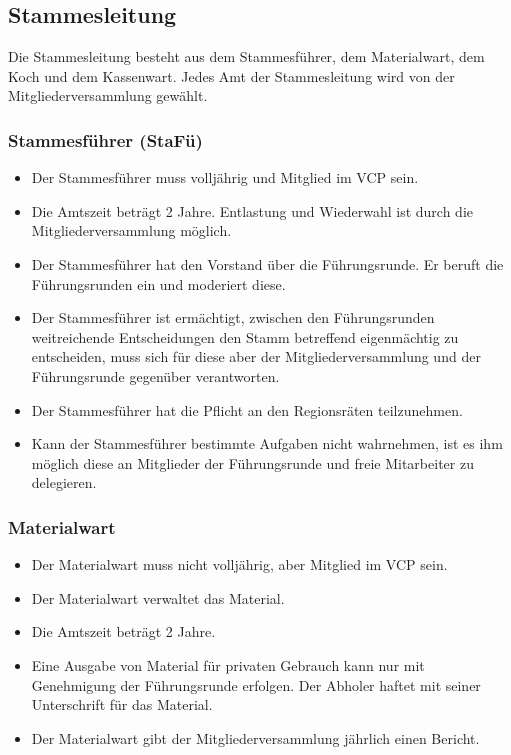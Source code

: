 \documentclass[a4paper]{article}
\begin{document}
    \subsection{Stammesleitung} %
    \label{sub:stammesleitung}
    Die Stammesleitung besteht aus dem Stammesführer, dem Materialwart, dem Koch und dem Kassenwart. Jedes Amt der Stammesleitung wird von der Mitgliederversammlung gewählt.
    \subsubsection{Stammesführer (StaFü)} %
    \label{ssub:stammesfuhrer_stafu}
	\begin{itemize}
        \item Der Stammesführer muss volljährig und Mitglied im VCP sein.
        \item Die Amtszeit beträgt 2 Jahre. Entlastung und Wiederwahl ist durch die Mitgliederversammlung möglich.
        \item Der Stammesführer hat den Vorstand über die Führungsrunde. Er beruft die Führungsrunden ein und moderiert diese.
        \item Der Stammesführer ist ermächtigt, zwischen den Führungsrunden weitreichende Entscheidungen den Stamm betreffend eigenmächtig zu entscheiden, muss sich für diese aber der Mitgliederversammlung und der Führungsrunde gegenüber verantworten.
        \item Der Stammesführer hat die Pflicht an den Regionsräten teilzunehmen.
        \item Kann der Stammesführer bestimmte Aufgaben nicht wahrnehmen, ist es ihm möglich diese an Mitglieder der Führungsrunde und freie Mitarbeiter zu delegieren.
	\end{itemize}
    
    \subsubsection{Materialwart} %
    \label{ssub:materialwart}
	\begin{itemize}
		\item Der Materialwart muss nicht volljährig, aber Mitglied im VCP sein. 
		\item Der Materialwart verwaltet das Material. 
		\item Die Amtszeit beträgt 2 Jahre. 
		\item Eine Ausgabe von Material für privaten Gebrauch kann nur mit Genehmigung der Führungsrunde erfolgen. Der Abholer haftet mit seiner Unterschrift für das Material. 
		\item Der Materialwart gibt der Mitgliederversammlung jährlich einen Bericht. 
	\end{itemize}
    
\end{document}
